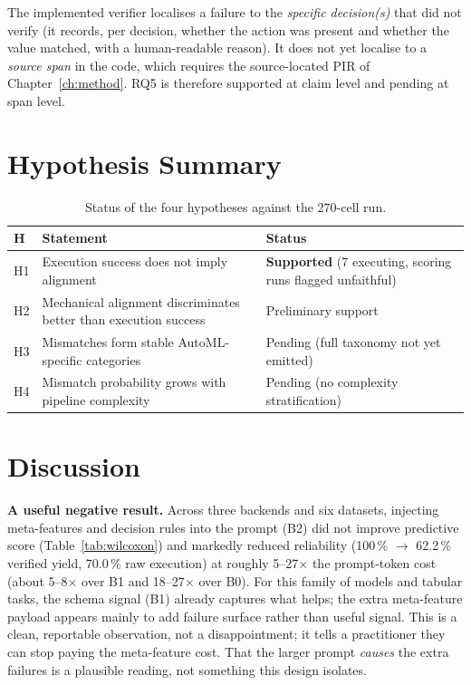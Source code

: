 The implemented verifier localises a failure to the \emph{specific
decision(s)} that did not verify (it records, per decision, whether
the action was present and whether the value matched, with a
human-readable reason). It does not yet localise to a \emph{source
span} in the code, which requires the source-located PIR of
Chapter~\ref{ch:method}. RQ5 is therefore supported at claim level and
pending at span level.

\section{Hypothesis Summary}

\begin{table}[H]
\centering
\caption{Status of the four hypotheses against the 270-cell run.}
\label{tab:hyp}
\small
\renewcommand{\arraystretch}{1.3}
\begin{tabular}{l p{6.8cm} p{4cm}}
\toprule
\textbf{H} & \textbf{Statement} & \textbf{Status} \\
\midrule
H1 & Execution success does not imply alignment & \textbf{Supported}
(7 executing, scoring runs flagged unfaithful) \\
H2 & Mechanical alignment discriminates better than execution success
& Preliminary support \\
H3 & Mismatches form stable AutoML-specific categories & Pending
(full taxonomy not yet emitted) \\
H4 & Mismatch probability grows with pipeline complexity & Pending (no
complexity stratification) \\
\bottomrule
\end{tabular}
\end{table}

\section{Discussion}

\textbf{A useful negative result.} Across three backends and six
datasets, injecting meta-features and decision rules into the prompt
(B2) did not improve predictive score (Table~\ref{tab:wilcoxon}) and
markedly reduced reliability (100\,\% $\rightarrow$ 62.2\,\% verified
yield, 70.0\,\% raw execution) at roughly 5--27$\times$ the
prompt-token cost (about 5--8$\times$ over B1 and 18--27$\times$ over
B0). For this family of models and
tabular tasks, the schema signal (B1) already captures what helps; the
extra meta-feature payload appears mainly to add failure surface
rather than useful signal. This is a clean, reportable observation,
not a disappointment; it tells a practitioner they can stop paying
the meta-feature cost. That the larger prompt \emph{causes} the extra
failures is a plausible reading, not something this design isolates.

